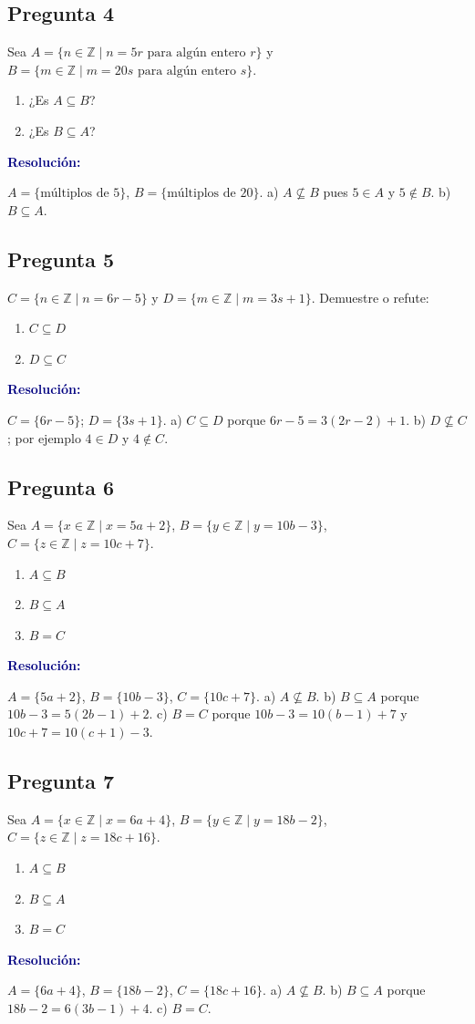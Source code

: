 \documentclass[12pt,a4paper]{article}
\newcommand{\resolucion}{\par\noindent\textbf{\textcolor{navy}{Resolución:}}\par}
\begin{document}
\subsection*{\textcolor{accent}{Pregunta 4}}
Sea $A=\{n\in\mathbb{Z}\mid n=5r\text{ para algún entero }r\}$ y $B=\{m\in\mathbb{Z}\mid m=20s\text{ para algún entero }s\}$.
\begin{enumerate}[label=\alph*.]
  \item ¿Es $A\subseteq B$? \item ¿Es $B\subseteq A$?
\end{enumerate}
\resolucion $A=\{\text{múltiplos de }5\}$, $B=\{\text{múltiplos de }20\}$. a) $A\not\subseteq B$ pues $5\in A$ y $5\notin B$. b) $B\subseteq A$.

\subsection*{\textcolor{accent}{Pregunta 5}}
$C=\{n\in\mathbb{Z}\mid n=6r-5\}$ y $D=\{m\in\mathbb{Z}\mid m=3s+1\}$. Demuestre o refute:
\begin{enumerate}[label=\alph*.]
  \item $C\subseteq D$ \item $D\subseteq C$
\end{enumerate}
\resolucion $C=\{6r-5\}$; $D=\{3s+1\}$. a) $C\subseteq D$ porque $6r-5=3(2r-2)+1$. b) $D\not\subseteq C$; por ejemplo $4\in D$ y $4\notin C$.

\subsection*{\textcolor{accent}{Pregunta 6}}
Sea $A=\{x\in\mathbb{Z}\mid x=5a+2\}$, $B=\{y\in\mathbb{Z}\mid y=10b-3\}$, $C=\{z\in\mathbb{Z}\mid z=10c+7\}$.
\begin{enumerate}[label=\alph*.]
  \item $A\subseteq B$ \item $B\subseteq A$ \item $B=C$
\end{enumerate}
\resolucion $A=\{5a+2\}$, $B=\{10b-3\}$, $C=\{10c+7\}$. a) $A\not\subseteq B$. b) $B\subseteq A$ porque $10b-3=5(2b-1)+2$. c) $B=C$ porque $10b-3=10(b-1)+7$ y $10c+7=10(c+1)-3$.

\subsection*{\textcolor{accent}{Pregunta 7}}
Sea $A=\{x\in\mathbb{Z}\mid x=6a+4\}$, $B=\{y\in\mathbb{Z}\mid y=18b-2\}$, $C=\{z\in\mathbb{Z}\mid z=18c+16\}$.
\begin{enumerate}[label=\alph*.]
  \item $A\subseteq B$ \item $B\subseteq A$ \item $B=C$
\end{enumerate}
\resolucion $A=\{6a+4\}$, $B=\{18b-2\}$, $C=\{18c+16\}$. a) $A\not\subseteq B$. b) $B\subseteq A$ porque $18b-2=6(3b-1)+4$. c) $B=C$.
\end{document}
